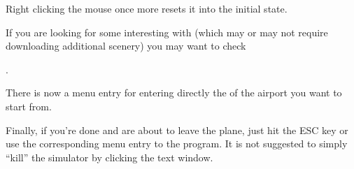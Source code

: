 Right clicking the mouse once more resets it into the initial state.

If you are looking for some interesting  with \FlightGear{}
(which may or may not require downloading additional scenery) you may want to check
 \medskip

 .
  \medskip

\noindent
 There is now a menu entry for entering directly the  of the
airport you want to start from.

Finally, if you're done and are about to leave the plane, just hit the ESC key or use the
corresponding menu entry to  the program. It is not suggested to simply
``kill'' the simulator by clicking the text window.



